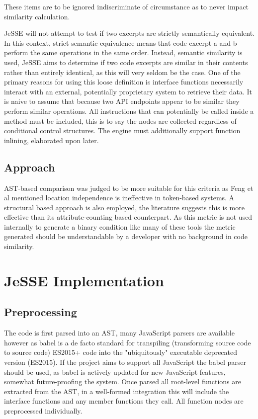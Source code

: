 \documentclass[jou,apacite]{apa6}
\begin{document}
These items are to be ignored indiscriminate of circumstance as to never impact similarity calculation. 

JeSSE will not attempt to test if two excerpts are strictly semantically equivalent. In this context,  strict semantic equivalence means that code excerpt a and b perform the same operations in the same order. Instead, semantic similarity is used, JeSSE aims to determine if two code excerpts are similar in their contents rather than entirely identical, as this will very seldom be the case. One of the primary reasons for using this loose definition is interface functions necessarily interact with an external, potentially proprietary system to retrieve their data. It is naive to assume that because two API endpoints appear to be similar they perform similar operations. 
All instructions that can potentially be called inside a method must be included, this is to say the nodes are collected regardless of conditional control structures. The engine must additionally support function inlining, elaborated upon later.

\subsection{Approach}
AST-based comparison was judged to be more suitable for this criteria as Feng et al mentioned location independence is ineffective in token-based systems. A structural based approach is also employed, the literature suggests this is more effective than its attribute-counting based counterpart. As this metric is not used internally to generate a binary condition like many of these tools the metric generated should be understandable by a developer with no background in code similarity.

\clearpage

\section{JeSSE Implementation}
\subsection{Preprocessing}
The code is first parsed into an AST, many JavaScript parsers are available however as babel is a de facto standard for transpiling (transforming source code to source code) ES2015+ code into the "ubiquitously" executable deprecated version (ES2015). If the project aims to support all JavaScript the babel parser should be used, as babel is actively updated for new JavaScript features, somewhat future-proofing the system. Once parsed all root-level functions are extracted from the AST,  in a well-formed integration this will include the interface functions and any member functions they call. All function nodes are preprocessed individually.
\end{document}
